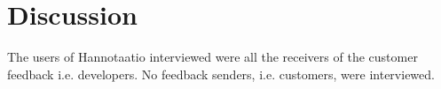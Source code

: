 \documentclass[a4paper]{article}
\begin{document}
\section{Discussion}
The users of Hannotaatio interviewed were all the receivers of the customer feedback i.e. developers. No feedback senders, i.e. customers, were interviewed.

\begin{comment}
How could someone criticize your results? Are they internally valid (the data was gathered and analyzed correctly)? Are the results externally valid (can they be generalized and how)? Based on the results, what can you say about the bigger picture you described in your introduction? How could someone apply your results for further research? Or perhaps apply in a non-research context (e.g., in a company or in everyday life)?
\end{comment}

\begin{comment}
KEEP IN MIND!
* A thesis is never read from the beginning to the end in a linear way: write each chapter as a “stand-alone”. 
* Make sure your research question, method, and results form a super clear and clean package: this is the question, this is what I did to find an answer, this is the answer. Your Mom should understand it.
* You will spend most of your sweat in the literature review.
* Choose an audience. Your professor is the most important (and perhaps the only) person who will read the thesis, but have also a wider audience in mind (e.g., colleagues, other professionals).
\end{comment}

\end{document}
